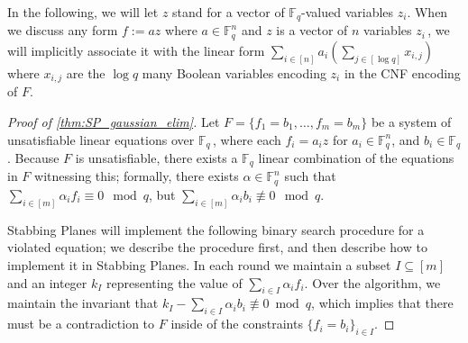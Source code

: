 %


In the following, we will let $z$ stand for a vector of $\mathbb{F}_q$-valued variables $z_i$. When we discuss any form $f := az$ where $a \in \mathbb{F}_q^n$ and $z$ is a vector of $n$ variables $z_i\,$, we will implicitly associate it with the linear form $\sum_{i \in [n]} a_i (\sum_{j \in [\log q]} x_{i,j})$ where $x_{i,j}$ are the $\log q$ many Boolean variables encoding $z_i$ in the CNF encoding of $F$.

\begin{proof}[Proof of \autoref{thm:SP_gaussian_elim}]
	Let $F = \{f_1 = b_1,\ldots, f_m = b_m\}$ be a system of unsatisfiable linear equations over $\mathbb{F}_q\,$, where each $f_i = a_iz$ for $a_i \in \mathbb{F}_q^n$, and $b_i \in \mathbb{F}_q$. Because $F$ is unsatisfiable, there exists a  $\mathbb{F}_q$ linear combination of the equations in $F$ witnessing this; formally, there exists $\alpha \in \mathbb{F}_q^n$ such that $\sum_{i \in [m]}  \alpha_i f_i  \equiv 0 \mod q$, but $\sum_{i \in [m]} \alpha_i b_i \not \equiv 0 \mod q$. 
	
	Stabbing Planes will implement the following binary search procedure for a violated equation; we describe the procedure first, and then describe how to implement it in Stabbing Planes. In each round we maintain a subset $I \subseteq [m]$ and an integer $k_I$ representing the value of $\sum_{i \in I} \alpha_i f_i$. Over the algorithm, we maintain the invariant that  $k_I - \sum_{i \in I} \alpha_i b_i \not \equiv 0 \bmod q$, which implies that there must be a contradiction to $F$ inside of the constraints $\{f_i = b_i\}_{i \in I}$.
	

\end{proof}
